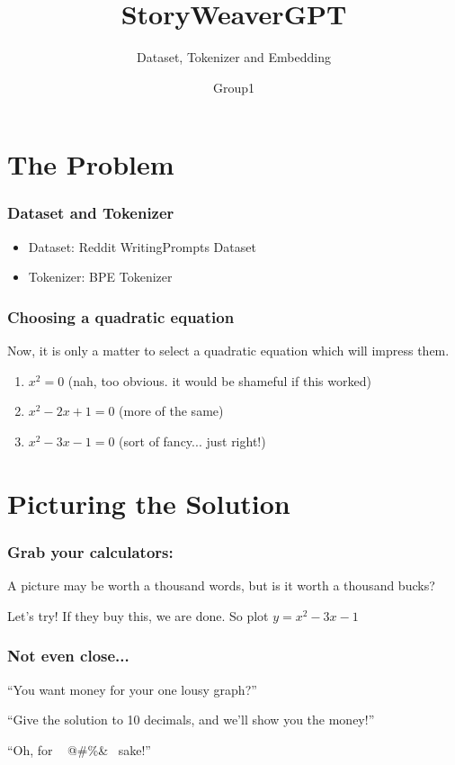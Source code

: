 \documentclass[
    10pt %
    16:9, %
]{beamer}
\title{StoryWeaverGPT}
\subtitle{Dataset, Tokenizer and Embedding}
\author{Group1}
\begin{document}
\frame{\titlepage} %
\section[Outline]{}
\frame{\tableofcontents}

\section{The Problem}
 
 
\frame %
{
  \frametitle{Dataset and Tokenizer}
 
  \begin{itemize}
    \item Dataset: Reddit WritingPrompts Dataset
    \item Tokenizer: BPE Tokenizer
  \end{itemize}
  
\vfill   
}
 
 \frame %
{
  \frametitle{Choosing a quadratic equation}

Now, it is only a matter to select a quadratic equation which will impress them.

\pause

\begin{enumerate}
\item $x^2  = 0$ \pause (nah, too obvious. it would be shameful if this worked)
\pause 
\item $x^2 -2x +1 = 0$ \pause (more of the same)
\pause
\item $x^2 -3x -1 = 0$ \pause (sort of fancy... just right!)
\end{enumerate}

}


\section{Picturing the Solution}
 
\frame %
{
  \frametitle{Grab your calculators:}
 
 A picture may be worth a thousand words, but is it worth   a thousand bucks?
 
 \medskip
 \pause
 
 Let's try! If they buy this, we are done. So plot $y = x^2 -3x -1$
 
 \pause
 

 
 \vfill   

}

 \frame %
{
  \frametitle{Not even close...}

``You want money for your one lousy graph?''

\pause

\bigskip

``Give the solution to 10 decimals, and we'll show you the money!''

\pause

\bigskip

``Oh, for  ~ @\#\%\*\&\@ ~ sake!''
}
\end{document}
